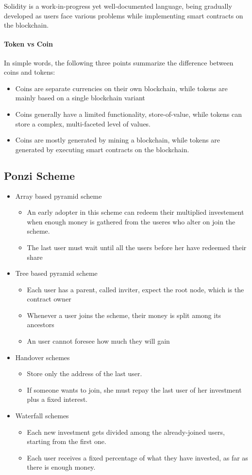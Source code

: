 Solidity is a work-in-progress yet well-documented language, being
gradually developed as users face various problems while implementing
smart contracts on the blockchain.

\paragraph{Token vs Coin}
In simple words, the following three points summarize the difference
between coins and tokens:
\begin{itemize}
\item  Coins are separate currencies on their own blockchain, while
tokens are mainly based on a single blockchain variant
\item Coins generally have a limited functionality, store-of-value, while
tokens can store a complex, multi-faceted level of values.
\item Coins are mostly generated by mining a blockchain, while tokens
are generated by executing smart contracts on the blockchain.
\end{itemize}

\subsection{Ponzi Scheme}
\begin{itemize}
\item Array based pyramid scheme
\begin{itemize}
\item An early adopter in this scheme can redeem their multiplied investement when enough money is gathered from the useres who alter on join the scheme.
\item The last user must wait until all the users before her have redeemed their share
\end{itemize}
\item Tree based pyramid scheme
\begin{itemize}
\item Each user has a parent, called inviter, expect the root node, which is the contract owner
\item Whenever a user joins the scheme, their money is split among its ancestors
\item An user cannot foresee how much they will gain
\end{itemize}
\item Handover schemes
\begin{itemize}
\item Store only the address of the last user.
\item If someone wants to join, she must repay the last user of her investment plus a fixed interest.
\end{itemize}
\item Waterfall schemes
\begin{itemize}
\item Each new investment gets divided among the already-joined users, starting from the first one.
\item Each user receives a fixed percentage of what they have invested, as far as there is enough money.
\end{itemize}
\end{itemize}